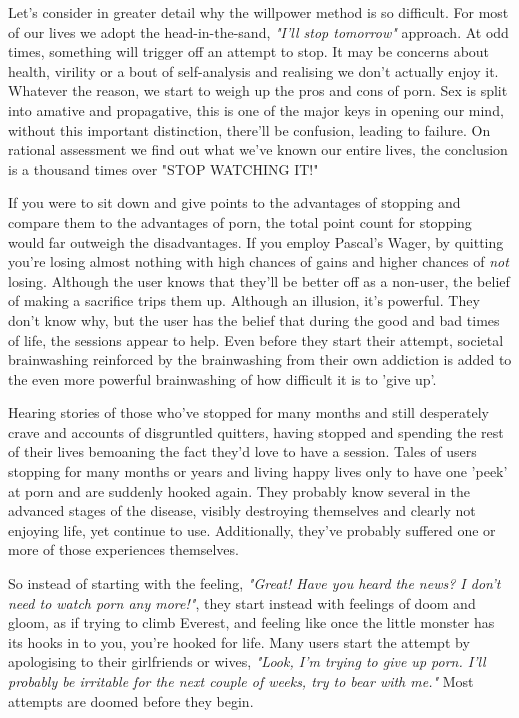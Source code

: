 \documentclass[easypeasy.tex]{subfiles}
\begin{document}
Let's consider in greater detail why the willpower method is so difficult. For most of our lives we adopt the head-in-the-sand, \textit{"I'll stop tomorrow"} approach. At odd times, something will trigger off an attempt to stop. It may be concerns about health, virility or a bout of self-analysis and realising we don't actually enjoy it. Whatever the reason, we start to weigh up the pros and cons of porn. Sex is split into amative and propagative, this is one of the major keys in opening our mind, without this important distinction, there'll be confusion, leading to failure. On rational assessment we find out what we've known our entire lives, the conclusion is a thousand times over "STOP WATCHING IT!"

If you were to sit down and give points to the advantages of stopping and compare them to the advantages of porn, the total point count for stopping would far outweigh the disadvantages. If you employ Pascal's Wager, by quitting you're losing almost nothing with high chances of gains and higher chances of \textit{not} losing. Although the user knows that they'll be better off as a non-user, the belief of making a sacrifice trips them up. Although an illusion, it's powerful. They don't know why, but the user has the belief that during the good and bad times of life, the sessions appear to help. Even before they start their attempt, societal brainwashing reinforced by the brainwashing from their own addiction is added to the even more powerful brainwashing of how difficult it is to 'give up'.

Hearing stories of those who've stopped for many months and still desperately crave and accounts of disgruntled quitters, having stopped and spending the rest of their lives bemoaning the fact they'd love to have a session. Tales of users stopping for many months or years and living happy lives only to have one 'peek' at porn and are suddenly hooked again. They probably know several in the advanced stages of the disease, visibly destroying themselves and clearly not enjoying life, yet continue to use. Additionally, they've probably suffered one or more of those experiences themselves.

So instead of starting with the feeling, \textit{"Great! Have you heard the news? I don't need to watch porn any more!"}, they start instead with feelings of doom and gloom, as if trying to climb Everest, and feeling like once the little monster has its hooks in to you, you're hooked for life. Many users start the attempt by apologising to their girlfriends or wives, \textit{"Look, I'm trying to give up porn. I'll probably be irritable for the next couple of weeks, try to bear with me."} Most attempts are doomed before they begin.
\end{document}
